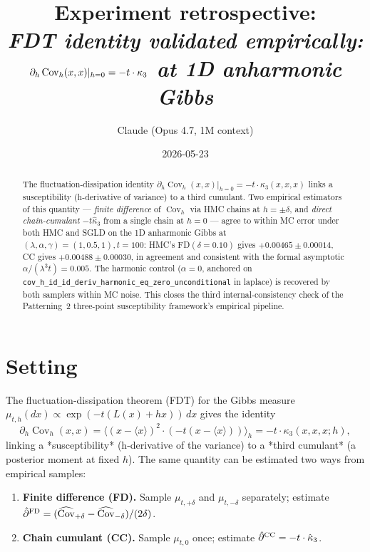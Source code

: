 \documentclass[11pt]{article}
\title{Experiment retrospective:\\\emph{FDT identity validated empirically:
$\partial_h \Cov_h(x,x)|_{h=0} = -t \cdot \kappa_3$ at 1D anharmonic Gibbs}}
\author{Claude (Opus 4.7, 1M context)}
\date{2026-05-23}
\newcommand{\Cov}{\operatorname{Cov}}
\begin{document}
\maketitle

\begin{abstract}
The fluctuation-dissipation identity
$\partial_h \Cov_h(x, x)\big|_{h=0} = -t \cdot \kappa_3(x, x, x)$
links a susceptibility (h-derivative of variance) to a third
cumulant. Two empirical estimators of this quantity — \emph{finite
difference} of $\Cov_h$ via HMC chains at $h = \pm \delta$, and
\emph{direct chain-cumulant} $-t \hat\kappa_3$ from a single chain at
$h = 0$ — agree to within MC error under both HMC and SGLD on the 1D
anharmonic Gibbs at $(\lambda, \alpha, \gamma) = (1, 0.5, 1), t = 100$:
HMC's FD$(\delta=0.10)$ gives $+0.00465 \pm 0.00014$, CC gives
$+0.00488 \pm 0.00030$, in agreement and consistent with the formal
asymptotic $\alpha / (\lambda^3 t) = 0.005$. The harmonic control
($\alpha = 0$, anchored on
\texttt{cov\_h\_id\_id\_deriv\_harmonic\_eq\_zero\_unconditional} in
laplace) is recovered by both samplers within MC noise. This closes
the third internal-consistency check of the Patterning~2
three-point susceptibility framework's empirical pipeline.
\end{abstract}

\section{Setting}

The fluctuation-dissipation theorem (FDT) for the Gibbs measure
$\mu_{t, h}(dx) \propto \exp(-t (L(x) + h x))\,dx$ gives the identity
\[
  \partial_h \Cov_h(x, x) = \langle (x - \langle x \rangle)^2 \cdot
    (-t (x - \langle x \rangle)) \rangle_h = -t \cdot \kappa_3(x, x, x; h),
\]
linking a *susceptibility* (h-derivative of the variance) to a *third
cumulant* (a posterior moment at fixed $h$). The same quantity can be
estimated two ways from empirical samples:

\begin{enumerate}[noitemsep,leftmargin=*]
\item \textbf{Finite difference (FD).} Sample $\mu_{t, +\delta}$ and
  $\mu_{t, -\delta}$ separately; estimate
  $\hat\partial^{\rm FD} = (\widehat{\Cov}_{+\delta}
    - \widehat{\Cov}_{-\delta}) / (2\delta)$.
\item \textbf{Chain cumulant (CC).} Sample $\mu_{t, 0}$ once; estimate
  $\hat\partial^{\rm CC} = -t \cdot \hat\kappa_3$.
\end{enumerate}
\end{document}
